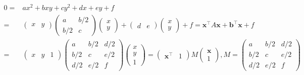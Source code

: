 \documentclass[
]{book}
\theoremstyle{definition}
\theoremstyle{definition}
\theoremstyle{definition}
\theoremstyle{definition}
\theoremstyle{remark}
\begin{document}
\[
\begin{aligned}
0= & ax^{2}+bxy+cy^{2}+dx+ey+f\\
= & \begin{pmatrix}x & y\end{pmatrix}\begin{pmatrix}a & b/2\\
b/2 & c
\end{pmatrix}\begin{pmatrix}x\\
y
\end{pmatrix}+\begin{pmatrix}d & e\end{pmatrix}\begin{pmatrix}x\\
y
\end{pmatrix}+f=\boldsymbol{x}^{\intercal}A\boldsymbol{x}+\boldsymbol{b}^{\intercal}\boldsymbol{x}+f\\
= & \begin{pmatrix}x & y & 1\end{pmatrix}\begin{pmatrix}a & b/2 & d/2\\
b/2 & c & e/2\\
d/2 & e/2 & f
\end{pmatrix}\begin{pmatrix}x\\
y\\
1
\end{pmatrix}=\begin{pmatrix}\boldsymbol{x}^{\intercal} & 1\end{pmatrix}M\begin{pmatrix}\boldsymbol{x}\\
1
\end{pmatrix},M=\begin{pmatrix}a & b/2 & d/2\\
b/2 & c & e/2\\
d/2 & e/2 & f
\end{pmatrix}
\end{aligned}
\]
\end{document}
